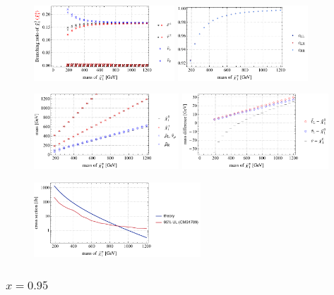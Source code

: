 \documentclass[a4paper,10pt,captions=tableheading,DIV=14]{scrartcl}
\numberwithin{equation}{section}
\begin{document}
\begin{figure}[h!]\centering
  \includegraphics[height=80pt]{../plots/plot_tab2x005_br21.pdf}
  \includegraphics[height=80pt]{../plots/plot_tab2x005_cfactors.pdf}\par
  \includegraphics[height=80pt]{../plots/plot_tab2x005_mass.pdf}
  \includegraphics[height=80pt]{../plots/plot_tab2x005_massdiff.pdf}\par
  \includegraphics[height=80pt]{../plots/plot_tab2x005_limit.pdf}
\end{figure}

\subsubsection{$x=0.95$}
\end{document}
